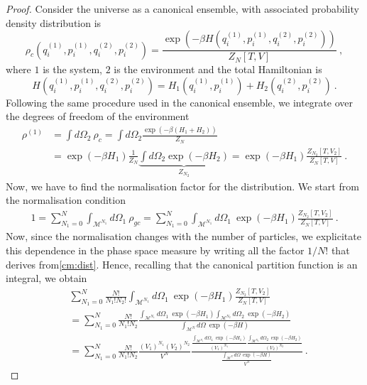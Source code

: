     \begin{proof}
        Consider the universe as a canonical ensemble, with associated probability density distribution is 
        \begin{equation*}
            \rho_c (q_i^{(1)}, p_i^{(1)}, q_i^{(2)}, p_i^{(2)}) = \frac{\exp (-\beta H (q_i^{(1)}, p_i^{(1)}, q_i^{(2)}, p_i^{(2)}))}{Z_N[T, V]} ~,
        \end{equation*}
        where $1$ is the system, $2$ is the environment and the total Hamiltonian is 
        \begin{equation*}
            H (q_i^{(1)}, p_i^{(1)}, q_i^{(2)}, p_i^{(2)}) = H_1 (q_i^{(1)}, p_i^{(1)}) + H_2 (q_i^{(2)}, p_i^{(2)}) ~.
        \end{equation*}
        Following the same procedure used in the canonical ensemble, we integrate over the degrees of freedom of the environment
        \begin{equation*}
        \begin{aligned}
            \rho^{(1)} & = \int d\Omega_2 ~ \rho_c = \int d\Omega_2 \frac{\exp(-\beta (H_1 + H_2))}{Z_N} \\ & = \exp(-\beta H_1) \frac{1}{Z_N} \underbrace{\int d\Omega_2 \exp(-\beta H_2)}_{Z_{N_2}} = \exp(-\beta H_1) \frac{Z_{N_2} [T, V_2]}{Z_N [T, V]} ~.
        \end{aligned}
        \end{equation*}
        Now, we have to find the normalisation factor for the distribution. We start from the normalisation condition
        \begin{equation*}
        \begin{aligned}
            1 = \sum_{N_1 = 0}^{N} \int_{\mathcal M^{N_1}} d\Omega_1 ~ \rho_{gc} = \sum_{N_1 = 0}^{N} \int_{\mathcal M^{N_1}} d\Omega_1 ~\exp(-\beta H_1) \frac{Z_{N_2} [T, V_2]}{Z_N [T, V]}  ~.
        \end{aligned}
        \end{equation*}
        Now, since the normalisation changes with the number of particles, we explicitate this dependence in the phase space measure by writing all the factor $1 / N!$ that derives from\eqref{cm:dist}. Hence, recalling that the canonical partition function is an integral, we obtain
        \begin{equation*}
        \begin{aligned}
            & \sum_{N_1 = 0}^{N} \frac{N!}{N_1! N_2!} \int_{\mathcal M^{N_1}} d\Omega_1 ~\exp(-\beta H_1) \frac{Z_{N_2} [T, V_2]}{Z_N [T, V]} \\ & = \sum_{N_1 = 0}^{N} \frac{N!}{N_1! N_2} \frac{\int_{\mathcal M^{N_1}} d\Omega_1 ~ \exp(-\beta H_1) \int_{\mathcal M^{N_2}} d\Omega_2 ~ \exp(-\beta H_2)}{\int_{\mathcal M^N} d\Omega ~ \exp(-\beta H)} \\ & = \sum_{N_1 = 0}^{N} \frac{N!}{N_1! N_2} \frac{(V_1)^{N_1} (V_2)^{N_2}}{V^N} \frac{\frac{\int_{\mathcal M^{N_1}} d\Omega_1 ~ \exp(-\beta H_1)}{(V_1)^{N_1}} \frac{\int_{\mathcal M^{N_2}} d\Omega_2 ~ \exp(-\beta H_2)}{(V_2)^{N_2}}}{\frac{\int_{\mathcal M^N} d\Omega ~ \exp(-\beta H)}{V^N}}  ~.

\end{aligned}
\end{equation*}
\end{proof}
